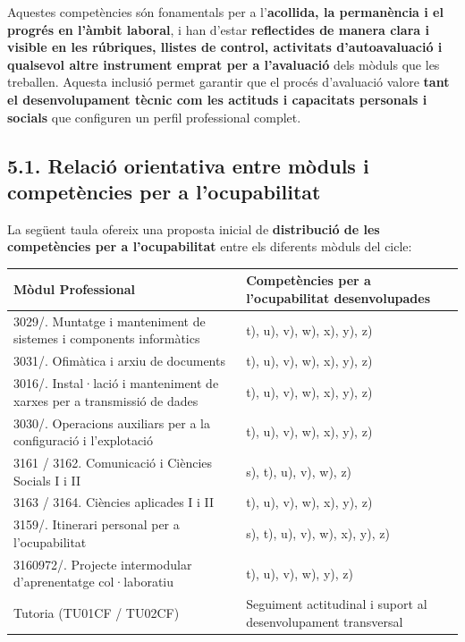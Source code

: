 \documentclass[
  paper=a4,
  ,captions=tableheading
]{scrartcl}
\begin{document}
Aquestes competències són fonamentals per a l'\textbf{acollida, la
permanència i el progrés en l'àmbit laboral}, i han d'estar
\textbf{reflectides de manera clara i visible en les rúbriques, llistes
de control, activitats d'autoavaluació i qualsevol altre instrument
emprat per a l'avaluació} dels mòduls que les treballen. Aquesta
inclusió permet garantir que el procés d'avaluació valore \textbf{tant
el desenvolupament tècnic com les actituds i capacitats personals i
socials} que configuren un perfil professional complet.

\hypertarget{relaciuxf3-orientativa-entre-muxf2duls-i-competuxe8ncies-per-a-locupabilitat}{%
\subsection{5.1. Relació orientativa entre mòduls i competències per a
l'ocupabilitat}\label{relaciuxf3-orientativa-entre-muxf2duls-i-competuxe8ncies-per-a-locupabilitat}}

La següent taula ofereix una proposta inicial de \textbf{distribució de
les competències per a l'ocupabilitat} entre els diferents mòduls del
cicle:

\begin{longtable}[]{@{}ll@{}}
\toprule
\textbf{Mòdul Professional} & \textbf{Competències per a l'ocupabilitat
desenvolupades} \\
\midrule
\endhead
3029/. Muntatge i manteniment de sistemes i components informàtics & t),
u), v), w), x), y), z) \\
3031/. Ofimàtica i arxiu de documents & t), u), v), w), x), y), z) \\
3016/. Instal·lació i manteniment de xarxes per a transmissió de dades &
t), u), v), w), x), y), z) \\
3030/. Operacions auxiliars per a la configuració i l'explotació & t),
u), v), w), x), y), z) \\
3161 / 3162. Comunicació i Ciències Socials I i II & s), t), u), v), w),
z) \\
3163 / 3164. Ciències aplicades I i II & t), u), v), w), x), y), z) \\
3159/. Itinerari personal per a l'ocupabilitat & s), t), u), v), w), x),
y), z) \\
3160972/. Projecte intermodular d'aprenentatge col·laboratiu & t), u),
v), w), y), z) \\
Tutoria (TU01CF / TU02CF) & Seguiment actitudinal i suport al
desenvolupament transversal \\
\bottomrule
\end{longtable}
\end{document}

